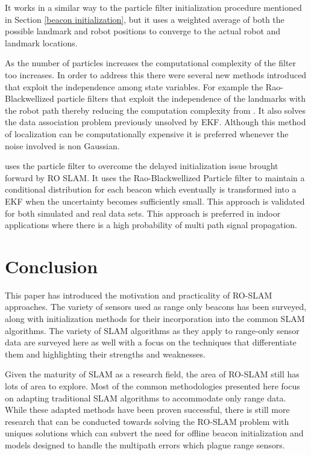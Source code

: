\documentclass[conference]{IEEEtran}
\begin{document}
It works in a similar way to the particle filter initialization procedure mentioned in Section \ref{beacon initialization}, but it uses a weighted average of both the possible landmark and robot positions to converge to the actual robot and landmark locations.

As the number of particles increases the computational complexity of the filter too increases. In order to address this there were several new methods introduced that  exploit the independence among state variables. For example the Rao-Blackwellized particle filters that exploit the independence of the landmarks with the robot path thereby reducing the computation complexity from \cite{Yuan2012}. It also solves the data association problem previously unsolved by EKF. Although this method of localization can be computationally expensive it is preferred whenever the noise involved is non Gaussian.
	

   \cite{Blanco2008a} uses the particle filter to overcome the delayed initialization issue brought forward by RO SLAM. It uses the Rao-Blackwellized Particle filter to maintain a conditional distribution for each beacon which eventually is transformed into a EKF when the uncertainty becomes sufficiently small. This approach is validated for both simulated and real data sets. This approach is preferred in indoor applications where there is a high probability of multi path signal propagation.

	
	
	
	
	
	
	
	
	
	
	
	
	
	
	
	
	\section{Conclusion}
	\label{conclusion}
	This paper has introduced the motivation and practicality of RO-SLAM approaches. The variety of sensors used as range only beacons has been surveyed, along with initialization methods for their incorporation into the common SLAM algorithms. The variety of SLAM algorithms as they apply to range-only sensor data are surveyed here as well with a focus on the techniques that differentiate them and highlighting their strengths and weaknesses.

	Given the maturity of SLAM as a research field, the area of RO-SLAM still has lots of area to explore. Most of the common methodologies presented here focus on adapting traditional SLAM algorithms to accommodate only range data. While these adapted methods have been proven successful, there is still more research that can be conducted towards solving the RO-SLAM problem with uniques solutions which can subvert the need for offline beacon initialization and models designed to handle the multipath errors which plague range sensors.
	
	
	
	
	
	
	
	
	
	
\end{document}
